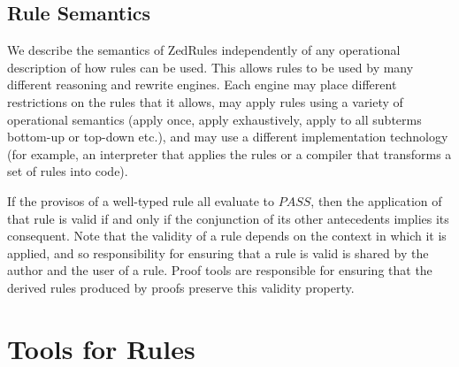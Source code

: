 \documentclass{entcs}
\begin{document}
\subsection{Rule Semantics}

We describe the semantics of ZedRules independently of any operational
description of how rules can be used.  This allows rules to be used by
many different reasoning and rewrite engines.  Each engine may place
different restrictions on the rules that it allows, may apply rules
using a variety of operational semantics (apply once, apply
exhaustively, apply to all subterms bottom-up or top-down etc.), and
may use a different implementation technology (for example, an
interpreter that applies the rules or a compiler that transforms a set
of rules into code).

If the provisos of a well-typed rule all evaluate to $PASS$,
then the application of that rule is valid if and only if
the conjunction of its other antecedents implies its consequent.
Note that the validity of a rule depends on the context in which it is applied,
and so responsibility for ensuring that a rule is valid
is shared by the author and the user of a rule.
%
%
Proof tools are
responsible for ensuring that the derived rules produced by proofs
preserve this validity property.


\section{Tools for Rules} \label{sec:tools}
\end{document}
